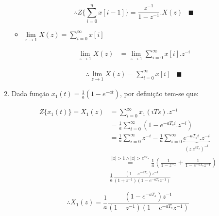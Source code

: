 \documentclass{article}
\begin{document}
\begin{enumerate}
\begin{itemize}
	\begin{equation}
	\therefore Z\{\sum_{i=0}^{n}x[i-1] \} = \frac{z^{-1}}{1-z^{-1}}.X(z) \hspace{10pt} \blacksquare
	\end{equation}

	\item $\lim\limits_{z \rightarrow 1} X(z) = \sum_{i=0}^{\infty}x[i]$

	\begin{equation}
	\begin{split}
	\lim\limits_{z \rightarrow 1} X(z) & = \lim\limits_{z \rightarrow 1} \sum_{i=0}^{\infty} x[i].z^{-i} 
	\end{split}
	\end{equation}
	
	\begin{equation}
	\begin{split}
	\therefore \lim\limits_{z \rightarrow 1} X(z) = \sum_{i=0}^{\infty}x[i] \hspace{10pt} \blacksquare
	\end{split}
	\end{equation}
	
\end{itemize}

\item\label{item:ex2b} %
Dada função $x_1(t) = \frac{1}{a} \left( 1 - e^{-at} \right)$, por definição tem-se que:

	\begin{equation}
	\begin{split}
	Z\{x_1(t)\} = X_1(z) & = \sum_{i=0}^{\infty} x_1(i Ts).z^{-i} \\
	& = \frac{1}{a} \sum_{i=0}^{\infty} \left( 1 - e^{-a T_s i}.z^{-i} \right) \\
	& = \frac{1}{a} \sum_{i=0}^{\infty} z^{-i} - \frac{1}{a} \sum_{i=0}^{\infty} \underbrace{e^{-a T_s i}.z^{-i}}_{(z.e^{aT_s})^{-i}} \\
	& \stackrel{|z| > 1 \wedge |z| > e^{aT_s}}{=} \frac{1}{a} (\frac{1}{1-z^ {-1}} + \frac{1}{1-e^{-aT_s} z^ {-1}}) \\
	& \frac{1}{a} \frac{(1 - e^{-aT_s})z^{-1}}{(1+z^{-1})(1-e^{-aT_s} z^ {-1})}
	\end{split}
	\end{equation}
	
	\begin{equation}
	\therefore X_1(z) = \frac{1}{a}  \frac{(1 - e^{-aT_s})z^{-1}}{(1-z^{-1})(1-e^{-aT_s} z^ {-1})}
	\end{equation}


\end{enumerate}
\end{document}
